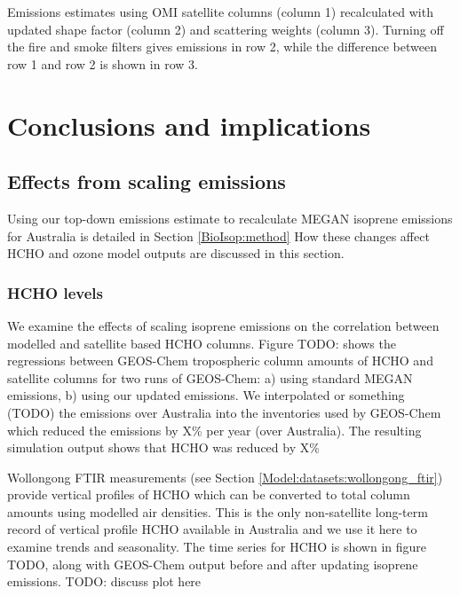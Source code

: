     {Emissions estimates using OMI satellite columns (column 1) recalculated with updated shape factor (column 2) and scattering weights (column 3). Turning off the fire and smoke filters gives emissions in row 2, while the difference between row 1 and row 2 is shown in row 3.}
    {\label{BioIsop:uncertainty:Fire:fig_emiss_without_fire_filter}}
    
    
    
    
\section{Conclusions and implications}
  \label{BioIsop:conclusions}
  
  
  
  \subsection{Effects from scaling emissions}
    \label{BioIsop:conclusions:scaled}
    Using our top-down emissions estimate to recalculate MEGAN isoprene emissions for Australia is detailed in Section \ref{BioIsop:method}
    How these changes affect HCHO and ozone model outputs are discussed in this section.
  
    \subsubsection{HCHO levels}
    
      We examine the effects of scaling isoprene emissions on the correlation between modelled and satellite based HCHO columns.
      Figure TODO: shows the regressions between GEOS-Chem tropospheric column amounts of HCHO and satellite columns for two runs of GEOS-Chem: a) using standard MEGAN emissions, b) using our updated emissions.
      We interpolated or something (TODO) the emissions over Australia into the inventories used by GEOS-Chem which reduced the emissions by X\% per year (over Australia).
      The resulting simulation output shows that HCHO was reduced by X\%
      
      Wollongong FTIR measurements (see Section \ref{Model:datasets:wollongong_ftir}) provide vertical profiles of HCHO which can be converted to total column amounts using modelled air densities.
      This is the only non-satellite long-term record of vertical profile HCHO available in Australia and we use it here to examine trends and seasonality.
      The time series for HCHO is shown in figure TODO, along with GEOS-Chem output before and after updating isoprene emissions.
      TODO: discuss plot here
              

